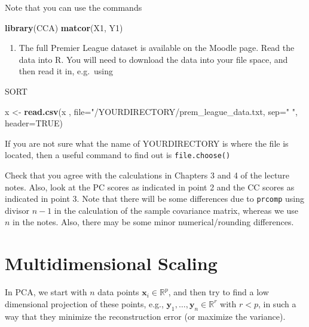 \documentclass[]{book}
\newenvironment{Shaded}{\begin{snugshade}}{\end{snugshade}}
\newcommand{\DataTypeTok}[1]{\textcolor[rgb]{0.13,0.29,0.53}{#1}}
\newcommand{\KeywordTok}[1]{\textcolor[rgb]{0.13,0.29,0.53}{\textbf{#1}}}
\newcommand{\NormalTok}[1]{#1}
\newcommand{\StringTok}[1]{\textcolor[rgb]{0.31,0.60,0.02}{#1}}
\providecommand{\tightlist}{%
  \setlength{\itemsep}{0pt}\setlength{\parskip}{0pt}}
\theoremstyle{definition}
\theoremstyle{definition}
\theoremstyle{definition}
\theoremstyle{remark}
\begin{document}
Note that you can use the commands

\begin{Shaded}
\begin{Highlighting}[]
\KeywordTok{library}\NormalTok{(CCA)}
\KeywordTok{matcor}\NormalTok{(X1, Y1)}
\end{Highlighting}
\end{Shaded}

\begin{enumerate}
\def\labelenumi{\arabic{enumi}.}
\setcounter{enumi}{2}
\tightlist
\item
  The full Premier League dataset is available on the Moodle page. Read the data into R. You will need to download the data into your file space, and then
  read it in, e.g.~using
\end{enumerate}

SORT

\begin{Shaded}
\begin{Highlighting}[]
\NormalTok{x <-}\StringTok{ }\KeywordTok{read.csv}\NormalTok{(x , }\DataTypeTok{file=}\StringTok{"/YOURDIRECTORY/prem_league_data.txt, sep="} \StringTok{", header=TRUE)}
\end{Highlighting}
\end{Shaded}

If you are not sure what the name of YOURDIRECTORY is where the file is located, then a useful command to find out is \texttt{file.choose()}

Check that you agree with the calculations in Chapters 3 and 4 of the lecture notes. Also, look at the PC scores as indicated in point 2 and the CC scores as indicated in point 3. Note that there will be some differences due to \texttt{prcomp} using divisor \(n-1\) in the calculation of the sample covariance matrix, whereas we use \(n\) in the notes.
Also, there may be some minor numerical/rounding differences.

\hypertarget{mds}{%
\chapter{Multidimensional Scaling}\label{mds}}

In PCA, we start with \(n\) data points \(\boldsymbol x_i \in \mathbb{R}^p\), and then try to find a low dimensional projection of these points, e.g., \(\boldsymbol y_1, \ldots, \boldsymbol y_n \in \mathbb{R}^r\) with \(r<p\), in such a way that they minimize the reconstruction error (or maximize the variance).
\end{document}
